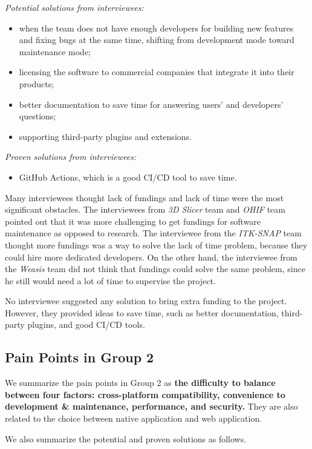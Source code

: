 \noindent\textit{Potential solutions from interviewees:}
\begin{itemize}
\item when the team does not have enough developers for building new features and fixing bugs at the same time, shifting from development mode toward maintenance mode;
\item licensing the software to commercial companies that integrate it into their products;
\item better documentation to save time for answering users' and developers' questions;
\item supporting third-party plugins and extensions.
\end{itemize}

\noindent\textit{Proven solutions from interviewees:}
\begin{itemize}
\item GitHub Actions, which is a good CI/CD tool to save time.
\end{itemize}

Many interviewees thought lack of fundings and lack of time were the most significant obstacles. The interviewees from \textit{3D Slicer} team and \textit{OHIF} team pointed out that it was more challenging to get fundings for software maintenance as opposed to research. The interviewee from the \textit{ITK-SNAP} team thought more fundings was a way to solve the lack of time problem, because they could hire more dedicated developers. On the other hand, the interviewee from the \textit{Weasis} team did not think that fundings could solve the same problem, since he still would need a lot of time to supervise the project.

No interviewee suggested any solution to bring extra funding to the project. However, they provided ideas to save time, such as better documentation, third-party plugins, and good CI/CD tools.

\subsection{Pain Points in Group 2}
\label{sec_pain_points_2}
We summarize the pain points in Group 2 as
\textbf{the difficulty to balance between four factors: cross-platform compatibility, convenience to development \& maintenance, performance, and security.} They are also related to the choice between native application and web application.

We also summarize the potential and proven solutions as follows.

